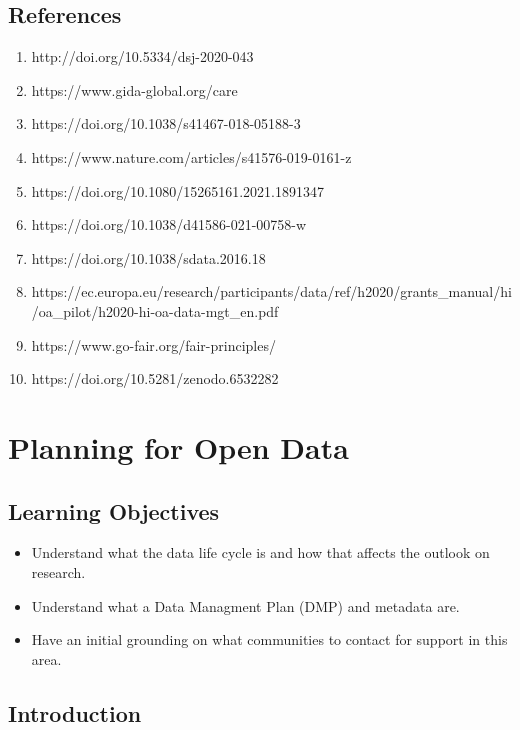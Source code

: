 \documentclass[
  letterpaper,
  DIV=11,
  numbers=noendperiod]{scrreport}
\providecommand{\tightlist}{%
  \setlength{\itemsep}{0pt}\setlength{\parskip}{0pt}}\usepackage{longtable,booktabs,array}
\begin{document}
\hypertarget{references-5}{%
\section{References}\label{references-5}}

\begin{enumerate}
\def\labelenumi{\arabic{enumi}.}
\tightlist
\item
  http://doi.org/10.5334/dsj-2020-043
\item
  https://www.gida-global.org/care
\item
  https://doi.org/10.1038/s41467-018-05188-3
\item
  https://www.nature.com/articles/s41576-019-0161-z
\item
  https://doi.org/10.1080/15265161.2021.1891347
\item
  https://doi.org/10.1038/d41586-021-00758-w
\item
  https://doi.org/10.1038/sdata.2016.18
\item
  https://ec.europa.eu/research/participants/data/ref/h2020/grants\_manual/hi/oa\_pilot/h2020-hi-oa-data-mgt\_en.pdf
\item
  https://www.go-fair.org/fair-principles/
\item
  https://doi.org/10.5281/zenodo.6532282
\end{enumerate}

\hypertarget{planning-for-open-data}{%
\chapter{Planning for Open Data}\label{planning-for-open-data}}

\hypertarget{learning-objectives-3}{%
\section{Learning Objectives}\label{learning-objectives-3}}

\begin{itemize}
\tightlist
\item
  Understand what the data life cycle is and how that affects the
  outlook on research.
\item
  Understand what a Data Managment Plan (DMP) and metadata are.
\item
  Have an initial grounding on what communities to contact for support
  in this area.
\end{itemize}

\hypertarget{introduction-14}{%
\section{Introduction}\label{introduction-14}}
\end{document}
